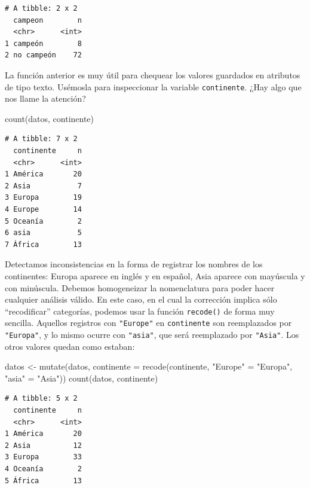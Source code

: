 \documentclass[
]{book}
\newenvironment{Shaded}{\begin{snugshade}}{\end{snugshade}}
\newcommand{\AttributeTok}[1]{\textcolor[rgb]{0.77,0.63,0.00}{#1}}
\newcommand{\FunctionTok}[1]{\textcolor[rgb]{0.00,0.00,0.00}{#1}}
\newcommand{\NormalTok}[1]{#1}
\newcommand{\OtherTok}[1]{\textcolor[rgb]{0.56,0.35,0.01}{#1}}
\newcommand{\StringTok}[1]{\textcolor[rgb]{0.31,0.60,0.02}{#1}}
\begin{document}
\begin{verbatim}
# A tibble: 2 x 2
  campeon        n
  <chr>      <int>
1 campeón        8
2 no campeón    72
\end{verbatim}

La función anterior es muy útil para chequear los valores guardados en atributos de tipo texto. Usémosla para inspeccionar la variable \texttt{continente}. ¿Hay algo que nos llame la atención?

\begin{Shaded}
\begin{Highlighting}[]
\FunctionTok{count}\NormalTok{(datos, continente)}
\end{Highlighting}
\end{Shaded}

\begin{verbatim}
# A tibble: 7 x 2
  continente     n
  <chr>      <int>
1 América       20
2 Asia           7
3 Europa        19
4 Europe        14
5 Oceanía        2
6 asia           5
7 África        13
\end{verbatim}

Detectamos inconsistencias en la forma de registrar los nombres de los continentes: Europa aparece en inglés y en español, Asia aparece con mayúscula y con minúscula. Debemos homogeneizar la nomenclatura para poder hacer cualquier análisis válido. En este caso, en el cual la corrección implica sólo ``recodificar'' categorías, podemos usar la función \texttt{recode()} de forma muy sencilla. Aquellos registros con \texttt{"Europe"} en \texttt{continente} son reemplazados por \texttt{"Europa"}, y lo mismo ocurre con \texttt{"asia"}, que será reemplazado por \texttt{"Asia"}. Los otros valores quedan como estaban:

\begin{Shaded}
\begin{Highlighting}[]
\NormalTok{datos }\OtherTok{\textless{}{-}} \FunctionTok{mutate}\NormalTok{(datos, }\AttributeTok{continente =} \FunctionTok{recode}\NormalTok{(continente, }\StringTok{"Europe"} \OtherTok{=} \StringTok{"Europa"}\NormalTok{, }\StringTok{"asia"} \OtherTok{=} \StringTok{"Asia"}\NormalTok{))}
\FunctionTok{count}\NormalTok{(datos, continente)}
\end{Highlighting}
\end{Shaded}

\begin{verbatim}
# A tibble: 5 x 2
  continente     n
  <chr>      <int>
1 América       20
2 Asia          12
3 Europa        33
4 Oceanía        2
5 África        13
\end{verbatim}
\end{document}
